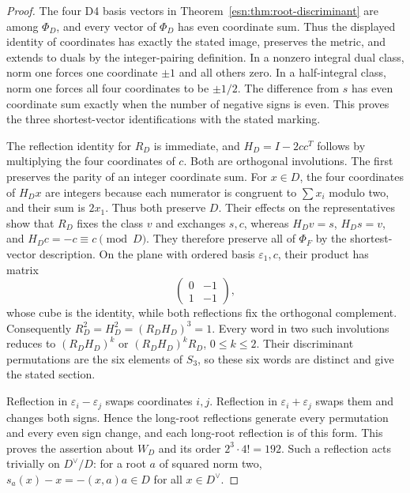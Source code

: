 \begin{proof}
The four D4 basis vectors in Theorem~\ref{esn:thm:root-discriminant}
are among \(\Phi_D\), and every vector of \(\Phi_D\) has even
coordinate sum.  Thus the displayed identity of coordinates has exactly
the stated image, preserves the metric, and extends to duals by the
integer-pairing definition.  In a nonzero integral dual class, norm one
forces one coordinate \(\pm1\) and all others zero.  In a
half-integral class, norm one forces all four coordinates to be
\(\pm1/2\).  The difference from \(s\) has even coordinate sum
exactly when the number of negative signs is even.  This proves the
three shortest-vector identifications with the stated marking.

The reflection identity for \(R_D\) is immediate, and
\(H_D=I-2cc^T\) follows by multiplying the four coordinates of \(c\).
Both are orthogonal involutions.  The first preserves the parity of an
integer coordinate sum.  For \(x\in D\), the four coordinates of
\(H_Dx\) are integers because each numerator is congruent to
\(\sum x_i\) modulo two, and their sum is \(2x_1\).  Thus both
preserve \(D\).  Their effects on the representatives show that
\(R_D\) fixes the class \(v\) and exchanges \(s,c\), whereas
\(H_Dv=s\), \(H_Ds=v\), and \(H_Dc=-c\equiv c\pmod D\).
They therefore preserve all of \(\Phi_F\) by the shortest-vector
description.  On the plane with ordered basis \(\varepsilon_1,c\),
their product has matrix
\[
 \begin{pmatrix}0&-1\\1&-1\end{pmatrix},
\]
whose cube is the identity, while both reflections fix the orthogonal
complement.  Consequently \(R_D^2=H_D^2=(R_DH_D)^3=1\).
Every word in two such involutions reduces to
\((R_DH_D)^k\) or \((R_DH_D)^kR_D\), \(0\le k\le2\).
Their discriminant permutations are the six elements of \(S_3\),
so these six words are distinct and give the stated section.

Reflection in \(\varepsilon_i-\varepsilon_j\) swaps coordinates
\(i,j\).  Reflection in \(\varepsilon_i+\varepsilon_j\) swaps them
and changes both signs.  Hence the long-root reflections generate every
permutation and every even sign change, and each long-root reflection
is of this form.  This proves the assertion about \(W_D\) and its
order \(2^3\cdot4!=192\).  Such a reflection acts trivially on
\(D^\vee/D\): for a root \(a\) of squared norm two,
\(s_a(x)-x=-(x,a)a\in D\) for all \(x\in D^\vee\).


\end{proof}

